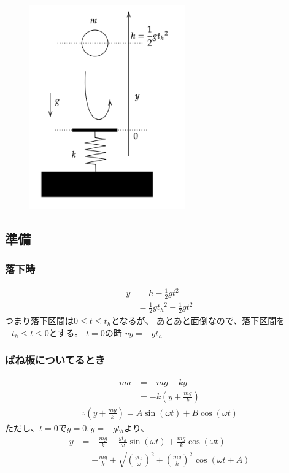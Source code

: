 \documentclass[a4paper,11pt]{jsarticle}
\begin{document}
\begin{figure}[h]
  \centering
  \includegraphics[width = 0.6\textwidth]{fall_and_spring.png}
  \caption{}
  \label{fall_and_spring.png}
\end{figure}

\subsection{準備}
\subsubsection{落下時}

\begin{align}
  y
   & = h - \frac{1}{2}gt^2
  \\ &= \frac{1}{2}g{t_h}^2 - \frac{1}{2}gt^2
\end{align}
つまり落下区間は$0\leq t \leq t_h$となるが、
あとあと面倒なので、落下区間を$-t_h\leq t \leq 0$とする。
$t = 0$の時
$vy = -gt_h$

\subsubsection{ばね板についてるとき}
\begin{align}
  ma & = -mg - ky
  \\ &= -k\left(y + \frac{mg}{k}\right)
\end{align}
\begin{align}
  \therefore
  \left(y+\frac{mg}{k}\right) = A\sin(\omega t) + B\cos(\omega t)
\end{align}
ただし、$t=0$で$y=0,\dot{y}=-gt_h$より、
\begin{align}
  y & = -\frac{mg}{k} - \frac{gt_h}{\omega}\sin(\omega t) + \frac{mg}{k}\cos(\omega t)
  \\ &= -\frac{mg}{k} + \sqrt{\left(\frac{gt_h}{\omega}\right)^2 + \left(\frac{mg}{k}\right)^2}\cos \left( \omega t + A \right)
\end{align}
\end{document}
